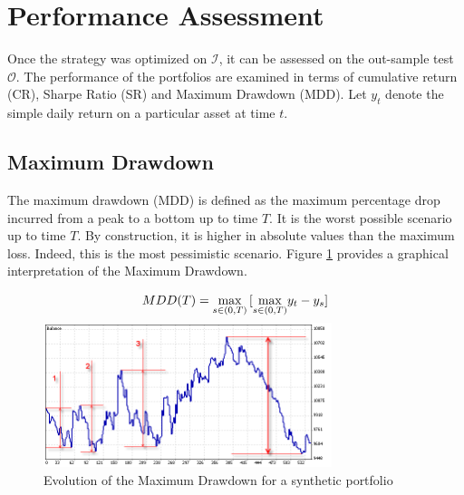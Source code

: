 \documentclass[11pt,a4,twosided,singlespacing,titlepagenumber=on]{scrreprt}
\numberwithin{equation}{chapter} %
\theoremstyle{remark}
\begin{document}
\section{Performance Assessment}
Once the strategy was optimized on $\mathcal{I}$, it can be assessed on the out-sample test $\mathcal{O}$. The performance of the portfolios are examined in terms of cumulative return (CR), Sharpe Ratio (SR) and Maximum Drawdown (MDD). Let $y_t$ denote the simple daily return on a particular asset at time $t$. 

\subsection{Maximum Drawdown}
The maximum drawdown (MDD) is defined as the maximum percentage drop incurred from a peak to a bottom up to time $T$. It is the worst possible scenario up to time $T$. By construction, it is higher in absolute values than the maximum loss. Indeed, this is the most pessimistic scenario. Figure \ref{mdd} provides a graphical interpretation of the Maximum Drawdown.

\begin{equation}
MDD(T) = \smash{\displaystyle\max_{s \in (0,T)}} \left[\smash{\displaystyle\max_{s \in (0,T)}} y_t - y_s \right] 
\end{equation}

\begin{figure}[H]
\centering
\includegraphics[width = 0.75\textwidth]{mdd}
\caption{Evolution of the Maximum Drawdown for a synthetic portfolio}
\label{mdd}
\end{figure}
\end{document}
